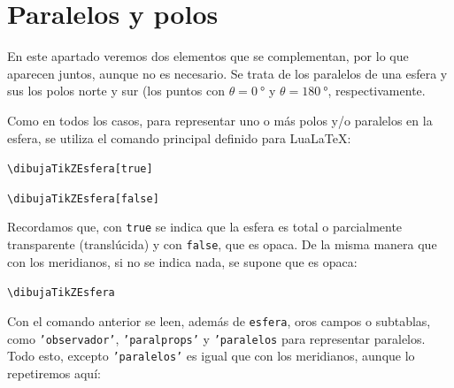 %

\chapter{Paralelos y polos}

En este apartado veremos dos elementos que se complementan, por lo que aparecen juntos,
aunque no es necesario. Se trata de los paralelos de una esfera y sus los polos norte
y sur (los puntos con $\theta=\qty{0}{\degree}$ y $\theta=\qty{180}{\degree}$,
respectivamente.

Como en todos los casos, para representar uno o más polos y/o paralelos en la esfera, se
utiliza el comando principal definido para Lua\LaTeX :
\begin{center}
  {\small\texttt{\textbackslash dibujaTikZEsfera[true]}}
  
  {\small\texttt{\textbackslash dibujaTikZEsfera[false]}}
\end{center}

Recordamos que, con \texttt{true} se indica que la esfera es total o parcialmente
transparente (translúcida) y con \texttt{false}, que es opaca.
De la misma manera que con los meridianos, si no se indica nada, se supone que es opaca:
\begin{center}
  {\small\texttt{\textbackslash dibujaTikZEsfera}}
\end{center}

Con el comando anterior se leen, además de \texttt{esfera}, oros campos o subtablas,
como \texttt{'observador'}, \texttt{'paralprops'} y \texttt{'paralelos} para representar
paralelos. Todo esto, excepto \texttt{'paralelos'} es igual que con los meridianos,
aunque lo repetiremos aquí:

